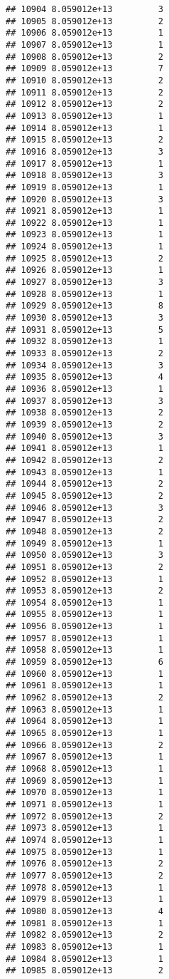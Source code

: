 \documentclass[
]{article}
\begin{document}
\begin{verbatim}
## 10904 8.059012e+13         3
## 10905 8.059012e+13         2
## 10906 8.059012e+13         1
## 10907 8.059012e+13         1
## 10908 8.059012e+13         2
## 10909 8.059012e+13         7
## 10910 8.059012e+13         2
## 10911 8.059012e+13         2
## 10912 8.059012e+13         2
## 10913 8.059012e+13         1
## 10914 8.059012e+13         1
## 10915 8.059012e+13         2
## 10916 8.059012e+13         3
## 10917 8.059012e+13         1
## 10918 8.059012e+13         3
## 10919 8.059012e+13         1
## 10920 8.059012e+13         3
## 10921 8.059012e+13         1
## 10922 8.059012e+13         1
## 10923 8.059012e+13         1
## 10924 8.059012e+13         1
## 10925 8.059012e+13         2
## 10926 8.059012e+13         1
## 10927 8.059012e+13         3
## 10928 8.059012e+13         1
## 10929 8.059012e+13         8
## 10930 8.059012e+13         3
## 10931 8.059012e+13         5
## 10932 8.059012e+13         1
## 10933 8.059012e+13         2
## 10934 8.059012e+13         3
## 10935 8.059012e+13         4
## 10936 8.059012e+13         1
## 10937 8.059012e+13         3
## 10938 8.059012e+13         2
## 10939 8.059012e+13         2
## 10940 8.059012e+13         3
## 10941 8.059012e+13         1
## 10942 8.059012e+13         2
## 10943 8.059012e+13         1
## 10944 8.059012e+13         2
## 10945 8.059012e+13         2
## 10946 8.059012e+13         3
## 10947 8.059012e+13         2
## 10948 8.059012e+13         2
## 10949 8.059012e+13         1
## 10950 8.059012e+13         3
## 10951 8.059012e+13         2
## 10952 8.059012e+13         1
## 10953 8.059012e+13         2
## 10954 8.059012e+13         1
## 10955 8.059012e+13         1
## 10956 8.059012e+13         1
## 10957 8.059012e+13         1
## 10958 8.059012e+13         1
## 10959 8.059012e+13         6
## 10960 8.059012e+13         1
## 10961 8.059012e+13         1
## 10962 8.059012e+13         2
## 10963 8.059012e+13         1
## 10964 8.059012e+13         1
## 10965 8.059012e+13         1
## 10966 8.059012e+13         2
## 10967 8.059012e+13         1
## 10968 8.059012e+13         1
## 10969 8.059012e+13         1
## 10970 8.059012e+13         1
## 10971 8.059012e+13         1
## 10972 8.059012e+13         2
## 10973 8.059012e+13         1
## 10974 8.059012e+13         1
## 10975 8.059012e+13         1
## 10976 8.059012e+13         2
## 10977 8.059012e+13         2
## 10978 8.059012e+13         1
## 10979 8.059012e+13         1
## 10980 8.059012e+13         4
## 10981 8.059012e+13         1
## 10982 8.059012e+13         2
## 10983 8.059012e+13         1
## 10984 8.059012e+13         1
## 10985 8.059012e+13         2

\end{verbatim}
\end{document}
